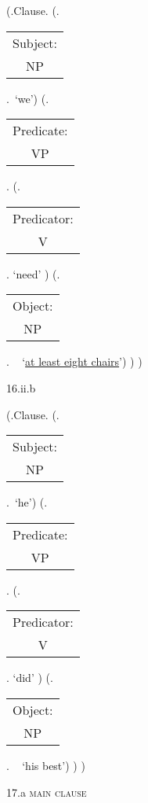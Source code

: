 \documentclass[12pt,letterpaper]{article}
\begin{document}
\begin{figure}
	\begin{center}
		\begin{parsetree}
			(.Clause.
			(.\begin{tabular}{c}Subject:\\NP\end{tabular}.~`we')
			(.\begin{tabular}{c}Predicate:\\VP\end{tabular}.
			(.\begin{tabular}{c}Predicator:\\V\end{tabular}. `need' )
			(.\begin{tabular}{c}Object:\\NP\end{tabular}.  ~ `\underline{at least eight chairs}')
			)
			)
			
			\hfill \break\hfill \break
		\end{parsetree}
		16.ii.b
	\end{center}
\end{figure}

\begin{figure}
	\begin{center}
		\begin{parsetree}
			(.Clause.
			(.\begin{tabular}{c}Subject:\\NP\end{tabular}.~`he')
			(.\begin{tabular}{c}Predicate:\\VP\end{tabular}.
			(.\begin{tabular}{c}Predicator:\\V\end{tabular}. `did' )
			(.\begin{tabular}{c}Object:\\NP\end{tabular}.  ~ `his best')
			)
			)
			
			\hfill \break\hfill \break
		\end{parsetree}
		17.a \textsc{main clause}
	\end{center}
\end{figure}
\end{document}
